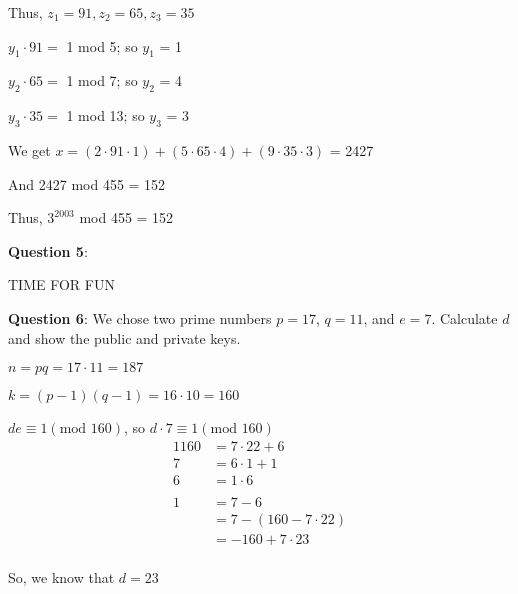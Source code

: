 \documentclass{article} %
\newcommand{\question}[2][]{\begin{flushleft}
        \textbf{Question #1}: #2

\end{flushleft}}
\begin{document}
    Thus, $z_1 = 91, z_2 = 65, z_3 = 35$

    $y_1 \cdot 91 = $ 1 mod 5; so $y_1$ = 1

    $y_2 \cdot 65 = $ 1 mod 7; so $y_2$ = 4

    $y_3 \cdot 35 = $ 1 mod 13; so $y_3$ = 3

    We get $x = (2 \cdot 91 \cdot 1) + (5 \cdot 65 \cdot 4) + (9 \cdot 35 \cdot 3)$ = 2427

    And 2427 mod 455 = 152

    Thus, $3^{2003}$ mod 455 = 152


    \newpage
    
    \question[5]{}

    TIME FOR FUN

    \question[6]{We chose two prime numbers $p = 17$, $q = 11$, and $e = 7$. Calculate $d$ and show the 
    public and private keys.}

    $n = pq = 17 \cdot 11 = 187$
    
    $k = (p-1)(q-1) = 16 \cdot 10 = 160$

    $de \equiv 1 (\text{mod } 160)$, so $d \cdot 7 \equiv 1 (\text{mod } 160)$
    \begin{alignat*}{1}
        160 &= 7 \cdot 22 + 6\\
        7 &= 6 \cdot 1 + 1\\
        6 &= 1 \cdot 6\\
        \\
        1 &= 7 - 6\\
        &= 7 - (160 - 7 \cdot 22)\\
        &= -160 + 7 \cdot 23\\
    \end{alignat*}

    So, we know that $d = 23$
\end{document}
